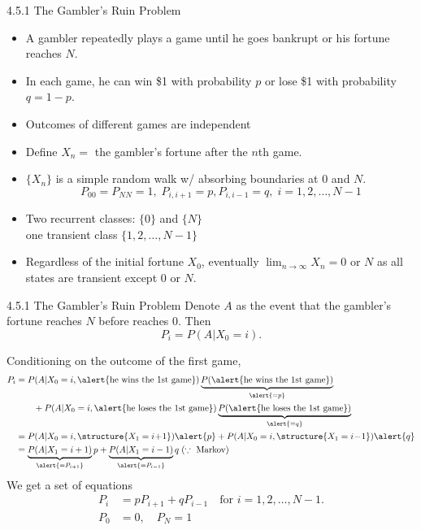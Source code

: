 \documentclass[letterpaper]{beamer}
\begin{document}
\begin{frame}{4.5.1 The Gambler's Ruin Problem}
\begin{itemize}
\item A gambler repeatedly plays a game until he goes bankrupt or his fortune reaches $N$.
\item In each game, he can win \$1 with probability $p$ or lose \$1 with probability $q=1-p$.
\item Outcomes of different games are independent
\item Define $X_n=$ the gambler's fortune after the $n$th game.
\item $\{X_n\}$ is a simple random walk w/ absorbing boundaries at 0 and $N$.
\[P_{00} = P_{NN} = 1, \;P_{i,i+1} = p, P_{i,i-1}=q ,\; i = 1, 2,\ldots, N - 1\]
\item Two recurrent classes: $\{0\}$ and $\{N\}$\\
one transient class $\{1, 2,\ldots, N - 1\}$
\item Regardless of the initial fortune $X_0$, eventually $\lim_{n\to\infty}X_n=0$ or $N$
as all states are transient except 0 or $N$.
\end{itemize}
\end{frame}
\begin{frame}{4.5.1 The Gambler's Ruin Problem}\small
Denote $A$ as the event that the gambler's fortune reaches $N$ before reaches 0.
Then
\[P_i=P(A|X_0=i).\]

Conditioning on the outcome of the first game,
\begin{align*}
P_i&=P(A|X_0=i, \alert{\text{he wins the 1st game}})
     \underbrace{P(\alert{\text{he wins the 1st game}})}_{\alert{=p}}\\
  &\qquad+ P(A|X_0=i,\alert{\text{he loses the 1st game}})
     \underbrace{P(\alert{\text{he loses the 1st game}})}_{\alert{=q}}\\
&=P(A|X_0=i,\structure{X_1=i\!+\!1})\alert{p}+ P(A|X_0=i,\structure{X_1=i\!-\!1})\alert{q}\\
&=\underbrace{P(A|X_1=i+1)}_{\alert{=P_{i+1}}}p+
\underbrace{P(A|X_1=i-1)}_{\alert{=P_{i-1}}}q \;(\because\text{ Markov})
\end{align*}
We get a set of equations
\begin{align*}
P_i&=pP_{i+1}+qP_{i-1} \quad\text{for }i=1,2,\ldots,N-1.\\
P_0&=0,\quad P_N=1
\end{align*}
\end{frame}
\end{document}

